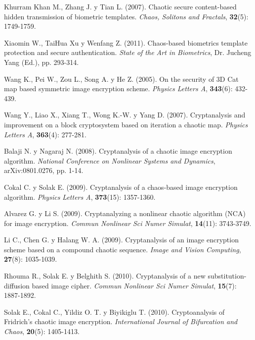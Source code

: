 \begin{thebibliography}{00}
Khurram Khan M., Zhang J. y Tian L. (2007).
\newblock Chaotic secure content-based hidden transmission of biometric templates.
\newblock \emph{Chaos, Solitons and Fractals}, \textbf{32}(5): 1749-1759.

Xiaomin W., TaiHua Xu y Wenfang Z. (2011).
\newblock Chaos-based biometrics template protection and secure authentication.
\newblock \emph{State of the Art in Biometrics}, Dr. Jucheng Yang (Ed.), pp. 293-314.

Wang K., Pei W., Zou L., Song A. y He Z. (2005).
\newblock On the security of 3D Cat map based symmetric image encryption scheme.
\newblock \emph{Physics Letters A}, \textbf{343}(6): 432-439.

Wang Y., Liao X., Xiang T., Wong K.-W. y Yang D. (2007).
\newblock Cryptanalysis and improvement on a block cryptosystem based on iteration a chaotic map.
\newblock \emph{Physics Letters A}, \textbf{363}(4): 277-281.

Balaji N. y Nagaraj N. (2008).
\newblock Cryptanalysis of a chaotic image encryption algorithm.
\newblock \emph{National Conference on Nonlinear Systems and Dynamics}, arXiv:0801.0276, pp. 1-14.

Cokal C. y Solak E. (2009).
\newblock Cryptanalysis of a chaos-based image encryption algorithm.
\newblock \emph{Physics Letters A}, \textbf{373}(15): 1357-1360.

Alvarez G. y Li S. (2009).
\newblock Cryptanalyzing a nonlinear chaotic algorithm (NCA) for image encryption.
\newblock \emph{Commun Nonlinear Sci Numer Simulat}, \textbf{14}(11): 3743-3749.

Li C., Chen G. y Halang W. A. (2009).
\newblock Cryptanalysis of an image encryption scheme based on a compound chaotic sequence.
\newblock \emph{Image and Vision Computing}, \textbf{27}(8): 1035-1039.

Rhouma R., Solak E. y Belghith S. (2010).
\newblock Cryptanalysis of a new substitution-diffusion based image cipher.
\newblock \emph{Commun Nonlinear Sci Numer Simulat}, \textbf{15}(7): 1887-1892.

Solak E., Cokal C., Yildiz O. T. y Biyikiglu T. (2010).
\newblock Cryptoanalysis of Fridrich's chaotic image encryption.
\newblock \emph{International Journal of Bifurcation and Chaos}, \textbf{20}(5): 1405-1413.


\end{thebibliography}
